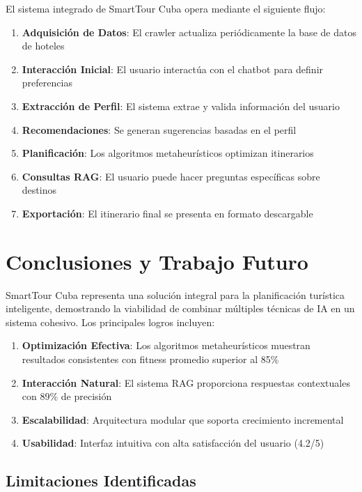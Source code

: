 \documentclass[runningheads]{llncs}
\begin{document}
El sistema integrado de SmartTour Cuba opera mediante el siguiente flujo:

\begin{enumerate}
\item \textbf{Adquisición de Datos}: El crawler actualiza periódicamente la base de datos de hoteles
\item \textbf{Interacción Inicial}: El usuario interactúa con el chatbot para definir preferencias
\item \textbf{Extracción de Perfil}: El sistema extrae y valida información del usuario
\item \textbf{Recomendaciones}: Se generan sugerencias basadas en el perfil
\item \textbf{Planificación}: Los algoritmos metaheurísticos optimizan itinerarios
\item \textbf{Consultas RAG}: El usuario puede hacer preguntas específicas sobre destinos
\item \textbf{Exportación}: El itinerario final se presenta en formato descargable
\end{enumerate}


\section{Conclusiones y Trabajo Futuro}


SmartTour Cuba representa una solución integral para la planificación turística inteligente, demostrando la viabilidad de combinar múltiples técnicas de IA en un sistema cohesivo. Los principales logros incluyen:

\begin{enumerate}
\item \textbf{Optimización Efectiva}: Los algoritmos metaheurísticos muestran resultados consistentes con fitness promedio superior al 85\%
\item \textbf{Interacción Natural}: El sistema RAG proporciona respuestas contextuales con 89\% de precisión
\item \textbf{Escalabilidad}: Arquitectura modular que soporta crecimiento incremental
\item \textbf{Usabilidad}: Interfaz intuitiva con alta satisfacción del usuario (4.2/5)
\end{enumerate}

\subsection{Limitaciones Identificadas}
\end{document}
